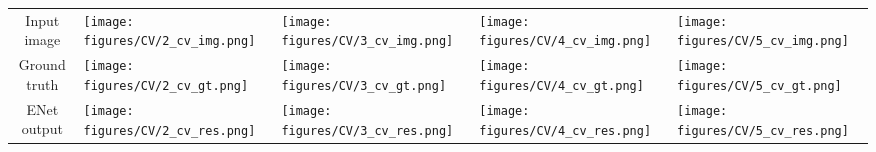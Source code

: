 \documentclass{article}
\begin{document}
\begin{table}[!htb]
  \begin{adjustbox}{width=1.0\textwidth,center}
    \small
    \begin{tabular}{CMMMM}
      Input image
      &\texttt{[image: figures/CV/2\_cv\_img.png]}
      &\texttt{[image: figures/CV/3\_cv\_img.png]}
      &\texttt{[image: figures/CV/4\_cv\_img.png]}
      &\texttt{[image: figures/CV/5\_cv\_img.png]}
      \\
      Ground truth
      &\texttt{[image: figures/CV/2\_cv\_gt.png]}
      &\texttt{[image: figures/CV/3\_cv\_gt.png]}
      &\texttt{[image: figures/CV/4\_cv\_gt.png]}
      &\texttt{[image: figures/CV/5\_cv\_gt.png]}
      \\
      ENet output
      &\texttt{[image: figures/CV/2\_cv\_res.png]}
      &\texttt{[image: figures/CV/3\_cv\_res.png]}
      &\texttt{[image: figures/CV/4\_cv\_res.png]}
      &\texttt{[image: figures/CV/5\_cv\_res.png]}
      \\
    \end{tabular}
  \end{adjustbox}
  \vspace{0.05in}
  \label{fig:camvid}


\end{table}
\end{document}
